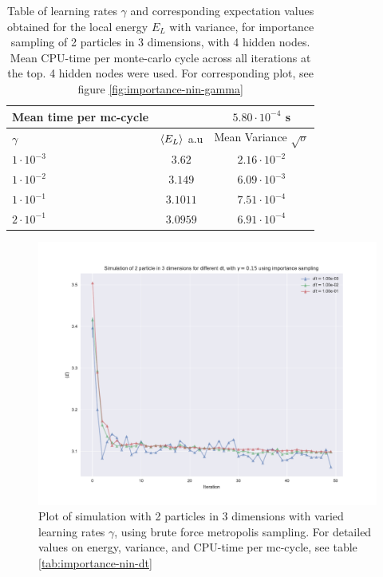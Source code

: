 \begin{table}[h]
\begin{tabular}{l c c}
	Mean time per mc-cycle & &$5.80\cdot10^{-4}$ s \\
	\hline
	$\gamma$ & $\langle E_L \rangle$ a.u & Mean Variance $\sqrt{\sigma}$\\
	\hline
	$1\cdot10^{-3}$ & $3.62$ & $2.16\cdot10^{-2}$ \\
	$1\cdot10^{-2}$ & $3.149$ & $6.09\cdot10^{-3}$ \\
	$1\cdot10^{-1}$ & $3.1011$ & $7.51\cdot10^{-4}$ \\
	$2\cdot10^{-1}$ & $3.0959$ & $6.91\cdot10^{-4}$ \\
\end{tabular}
\label{tab:importance-nin-gamma}
\caption{Table of learning rates $\gamma$ and corresponding expectation values obtained for the local energy $E_L$ with variance, for importance sampling
		of 2 particles in 3 dimensions, with 4 hidden nodes.
		Mean CPU-time per monte-carlo cycle across all iterations at the top. 4 hidden nodes were used.
	For corresponding plot, see figure \ref{fig:importance-nin-gamma}}
\end{table}

\begin{figure}[h]
\hspace{-2.8cm}
\includegraphics[width = \paperwidth]{figures/importance_2p_3d_dt.pdf}
\caption{Plot of simulation with 2 particles in 3 dimensions with varied learning rates $\gamma$, using brute force metropolis sampling.
			For detailed values on energy, variance, and CPU-time per mc-cycle, see table \ref{tab:importance-nin-dt}}
\label{fig:importance-nin-dt}
\end{figure}

